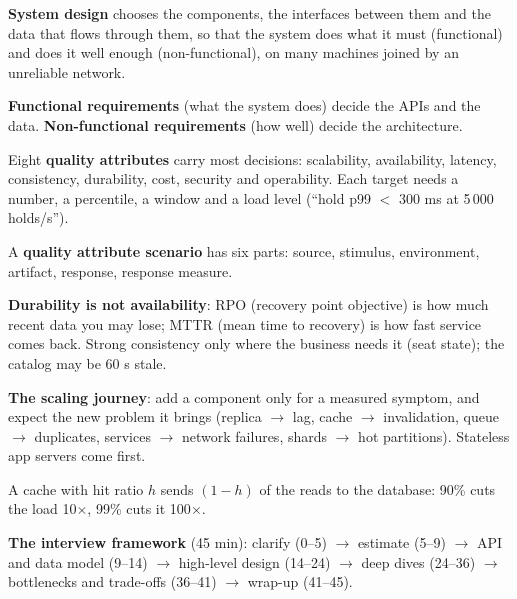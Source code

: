 \stages{\stClarify\ \stDesign}

\begin{know}
  \item \textbf{System design} chooses the components, the interfaces between them and the data that flows through them, so that the system does what it must (functional) and does it well enough (non-functional), on many machines joined by an unreliable network.
  \item \textbf{Functional requirements} (what the system does) decide the APIs and the data. \textbf{Non-functional requirements} (how well) decide the architecture.
  \item Eight \textbf{quality attributes} carry most decisions: scalability, availability, latency, consistency, durability, cost, security and operability. Each target needs a number, a percentile, a window and a load level (``hold p99 $<$ 300 ms at 5\,000 holds/s'').
  \item A \textbf{quality attribute scenario} has six parts: source, stimulus, environment, artifact, response, response measure.
  \item \textbf{Durability is not availability}: RPO (recovery point objective) is how much recent data you may lose; MTTR (mean time to recovery) is how fast service comes back. Strong consistency only where the business needs it (seat state); the catalog may be 60 s stale.
  \item \textbf{The scaling journey}: add a component only for a measured symptom, and expect the new problem it brings (replica $\to$ lag, cache $\to$ invalidation, queue $\to$ duplicates, services $\to$ network failures, shards $\to$ hot partitions). Stateless app servers come first.
  \item A cache with hit ratio $h$ sends $(1-h)$ of the reads to the database: 90\% cuts the load 10$\times$, 99\% cuts it 100$\times$.
  \item \textbf{The interview framework} (45 min): clarify (0--5) $\to$ estimate (5--9) $\to$ API and data model (9--14) $\to$ high-level design (14--24) $\to$ deep dives (24--36) $\to$ bottlenecks and trade-offs (36--41) $\to$ wrap-up (41--45).
\end{know}

